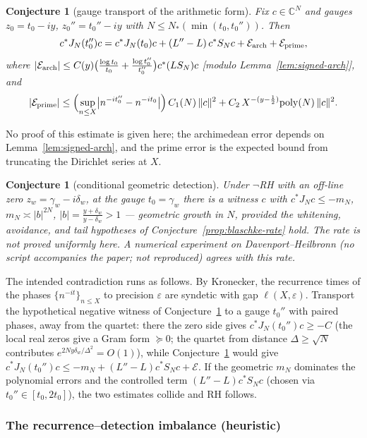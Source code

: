 \documentclass[11pt]{amsart}
\newtheorem{conjecture}[theorem]{Conjecture}
\theoremstyle{definition}
\theoremstyle{remark}
\theoremstyle{definition}
\newcommand{\C}{\mathbb{C}}
\begin{document}
\begin{conjecture}[gauge transport of the arithmetic form]\label{lem:transport}
Fix $c\in\C^N$ and gauges $z_0=t_0-iy$, $z_0''=t_0''-iy$ with $N\le N_*(\min(t_0,t_0''))$.  Then
\[
   c^*J_N(t_0'')c
   =
   c^*J_N(t_0)c+(L''-L)\,c^*S_Nc
   +\mathcal E_{\rm arch}+\mathcal E_{\rm prime},
\]
where $|\mathcal E_{\rm arch}|\le C(y)\bigl(\tfrac{\log t_0}{t_0}+\tfrac{\log t_0''}{t_0''}\bigr)
c^*(LS_N)c$ \textnormal{[modulo Lemma~\ref{lem:signed-arch}]}, and
\[
   |\mathcal E_{\rm prime}|
   \le
   \Bigl(\sup_{n\le X}\bigl|n^{-it_0''}-n^{-it_0}\bigr|\Bigr)\,C_1(N)\,\|c\|^2
   +C_2\,X^{-(y-\frac12)}{\rm poly}(N)\,\|c\|^2 .
\]
\end{conjecture}
\noindent No proof of this estimate is given here; the archimedean error depends on
Lemma~\ref{lem:signed-arch}, and the prime error is the expected bound from truncating the Dirichlet
series at $X$.

\begin{conjecture}[conditional geometric detection]\label{lem:geom-detection}
Under $\neg$RH with an off-line zero $z_w=\gamma_w-i\delta_w$, at the gauge $t_0=\gamma_w$ there is a
witness $c$ with $c^*J_Nc\le-m_N$, $m_N\asymp|b|^{2N}$, $|b|=\frac{y+\delta_w}{y-\delta_w}>1$ ---
geometric growth in $N$, provided the whitening, avoidance, and tail hypotheses of
Conjecture~\ref{prop:blaschke-rate} hold.  The rate is not proved uniformly here.
A numerical experiment on Davenport--Heilbronn (no script accompanies the paper; not reproduced) agrees with this rate.
\end{conjecture}

The intended contradiction runs as follows.  By Kronecker, the recurrence times of the phases
$\{n^{-it}\}_{n\le X}$ to precision $\varepsilon$ are syndetic with gap $\ell(X,\varepsilon)$.  Transport
the hypothetical negative witness of Conjecture~\ref{lem:geom-detection} to a gauge $t_0''$ with paired phases, away from
the quartet: there the zero side gives $c^*J_N(t_0'')c\ge-C$ (the local real zeros give a Gram form
$\succeq0$; the quartet from distance $\Delta\ge\sqrt N$ contributes $e^{2Ny\delta_w/\Delta^2}=O(1)$),
while Conjecture~\ref{lem:transport} would give $c^*J_N(t_0'')c\le-m_N+(L''-L)c^*S_Nc+\mathcal E$.  If the
geometric $m_N$ dominates the polynomial errors and the controlled term $(L''-L)c^*S_Nc$ (chosen via
$t_0''\in[t_0,2t_0]$), the two estimates collide and RH follows.

\subsubsection*{The recurrence--detection imbalance (heuristic)}
\end{document}
